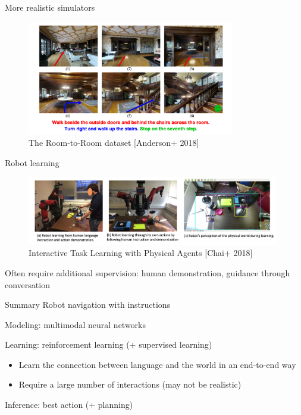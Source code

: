 \documentclass[usenames,dvipsnames,notes]{beamer}
\begin{document}
\begin{frame}
    {More realistic simulators}
    \begin{figure}
        \includegraphics[height=5cm]{figures/r2r}
        \caption{The Room-to-Room dataset [Anderson+ 2018]}
    \end{figure}
\end{frame}

\begin{frame}
    {Robot learning}
    \begin{figure}
        \includegraphics[height=3cm]{figures/robot-rl}
        \caption{ Interactive Task Learning with Physical Agents [Chai+ 2018]}
    \end{figure}

    Often require additional supervision: human demonstration, guidance through conversation
\end{frame}

\begin{frame}
    {Summary}
    Robot navigation with instructions

    Modeling: multimodal neural networks

    Learning: reinforcement learning (+ supervised learning)\\
    \begin{itemize}
        \item Learn the connection between language and the world in an end-to-end way
        \item Require a large number of interactions (may not be realistic)
    \end{itemize}

    Inference: best action (+ planning)
\end{frame}
\end{document}
